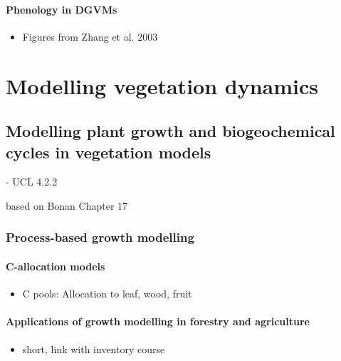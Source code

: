 \documentclass[oneside]{book}
\providecommand{\tightlist}{%
  \setlength{\itemsep}{0pt}\setlength{\parskip}{0pt}}
\begin{document}
\subsection{Phenology in DGVMs}\label{phenology-in-dgvms}

\begin{itemize}
\tightlist
\item
  Figures from Zhang et al. 2003
\end{itemize}

\part{Modelling vegetation
dynamics}\label{part-modelling-vegetation-dynamics}

\chapter{Modelling plant growth and biogeochemical cycles in vegetation
models}\label{modelling-plant-growth-and-biogeochemical-cycles-in-vegetation-models}

 - UCL 4.2.2

based on Bonan Chapter 17

\section{Process-based growth
modelling}\label{process-based-growth-modelling}

\subsection{C-allocation models}\label{c-allocation-models}

\begin{itemize}
\tightlist
\item
  C pools: Allocation to leaf, wood, fruit
\end{itemize}

\subsection{Applications of growth modelling in forestry and
agriculture}\label{applications-of-growth-modelling-in-forestry-and-agriculture}

\begin{itemize}
\tightlist
\item
  short, link with inventory course
\end{itemize}
\end{document}
